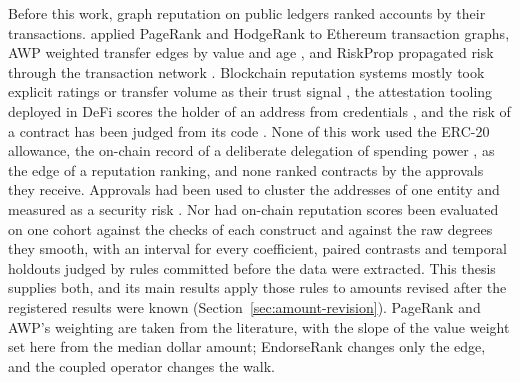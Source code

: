 Before this work, graph reputation on public ledgers ranked accounts by their transactions. \textcite{do2023hodgerank} applied PageRank and HodgeRank to Ethereum transaction graphs, AWP weighted transfer edges by value and age \parencite{do2023awp}, and RiskProp propagated risk through the transaction network \parencite{lin2025riskprop}. Blockchain reputation systems mostly took explicit ratings or transfer volume as their trust signal \parencite{bellini2020trust}, the attestation tooling deployed in DeFi scores the holder of an address from credentials \parencite{humanpassportnddocs}, and the risk of a contract has been judged from its code \parencite{lin2024crpwarner}. None of this work used the ERC-20 allowance, the on-chain record of a deliberate delegation of spending power \parencite{vogelsteller2015erc20}, as the edge of a reputation ranking, and none ranked contracts by the approvals they receive. Approvals had been used to cluster the addresses of one entity \parencite{victor2020clustering} and measured as a security risk \parencite{wang2022unlimited}. Nor had on-chain reputation scores been evaluated on one cohort against the checks of each construct and against the raw degrees they smooth, with an interval for every coefficient, paired contrasts and temporal holdouts judged by rules committed before the data were extracted. This thesis supplies both, and its main results apply those rules to amounts revised after the registered results were known (Section~\ref{sec:amount-revision}). PageRank \parencite{page1999pagerank} and AWP's weighting are taken from the literature, with the slope of the value weight set here from the median dollar amount; EndorseRank changes only the edge, and the coupled operator changes the walk.

